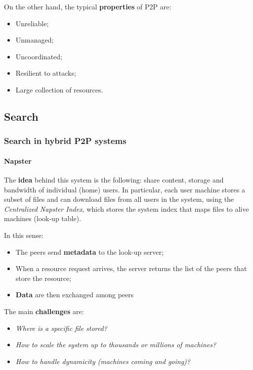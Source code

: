On the other hand, the typical \textbf{properties} of P2P are:
\begin{itemize}
    \item Unreliable;
    \item Unmanaged;
    \item Uncoordinated;
    \item Resilient to attacks;
    \item Large collection of resources.
\end{itemize}

\subsection{Search}
\subsubsection{Search in hybrid P2P systems}
\paragraph{Napster}
The \textbf{idea} behind this system is the following: share content, storage and bandwidth of individual (home) users. In particular, each user machine stores a subset of files and can download files from all users in the system, using the \textit{Centralized Napster Index}, which stores the system index that maps files to alive machines (look-up table).


In this sense:
\begin{itemize}
    \item The peers send \textbf{metadata} to the look-up server;
    \item When a resource request arrives, the server returns the list of the peers that store the resource;
    \item \textbf{Data} are then exchanged among peers
\end{itemize}

The main \textbf{challenges} are:
\begin{itemize}
    \item \textit{Where is a specific file stored?}
    \item \textit{How to scale the system up to thousands or millions of machines?}
    \item \textit{How to handle dynamicity (machines coming and going)?}
\end{itemize}

